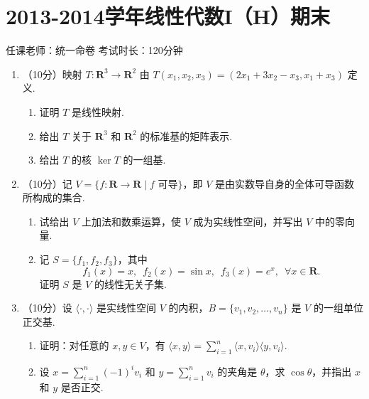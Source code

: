 \section{2013-2014学年线性代数I（H）期末}

\begin{center}
    任课老师：统一命卷\hspace{4em} 考试时长：120分钟
\end{center}

\begin{enumerate}
    \item （10分）映射 $T\colon \mathbf{R}^3 \to \mathbf{R}^2$ 由 $T(x_1,x_2,x_3)=(2x_1+3x_2-x_3,x_1+x_3)$ 定义.
    \begin{enumerate}
        \item 证明 $T$ 是线性映射.

        \item 给出 $T$ 关于 $\mathbf{R}^3$ 和 $\mathbf{R}^2$ 的标准基的矩阵表示.

        \item 给出 $T$ 的核 $\ker T$ 的一组基.
    \end{enumerate}

\item （10分）记 $V=\{f\colon \mathbf{R}\to \mathbf{R}\mid f \text{~可导} \}$，即 $V$ 是由实数导自身的全体可导函数所构成的集合.
    \begin{enumerate}
        \item 试给出 $V$ 上加法和数乘运算，使 $V$ 成为实线性空间，并写出 $V$ 中的零向量.

        \item 记 $S=\{f_1,f_2,f_3\}$，其中
        \[f_1(x)=x, \enspace f_2(x)=\sin x, \enspace f_3(x)=e^x,\enspace \forall x \in \mathbf{R}.\]
        证明 $S$ 是 $V$ 的线性无关子集.
    \end{enumerate}

\item （10分）设 $\langle\cdot,\cdot\rangle$ 是实线性空间 $V$ 的内积，$B=\{v_1,v_2,\ldots,v_n\}$ 是 $V$ 的一组单位正交基.
    \begin{enumerate}
        \item 证明：对任意的 $x,y \in V$，有 $\langle x,y\rangle = \sum\limits_{i=1}^n\langle x,v_i\rangle\langle y,v_i\rangle$.

        \item 设 $x=\sum\limits_{i=1}^n(-1)^iv_i$ 和 $y=\sum\limits_{i=1}^nv_i$ 的夹角是 $\theta$，求 $\cos \theta$，并指出 $x$ 和 $y$ 是否正交.
    \end{enumerate}


\end{enumerate}
